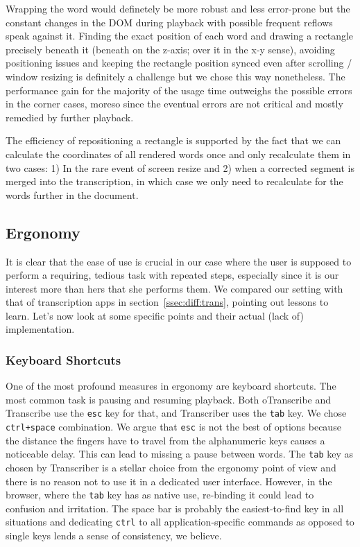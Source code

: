 \documentclass{svproc}
\begin{document}
Wrapping the word would definetely be more robust and less error-prone but the
constant changes in the DOM during playback with possible frequent reflows speak
against it. Finding the exact position of each word and drawing a rectangle
precisely beneath it (beneath on the z-axis; over it in the x-y sense), avoiding
positioning issues and keeping the rectangle position synced even after scrolling
/ window resizing is definitely a challenge but we chose this way nonetheless.
The performance gain for the majority of the usage time outweighs the possible
errors in the corner cases, moreso since the eventual errors are not critical
and mostly remedied by further playback.

The efficiency of repositioning a rectangle is supported by the fact that we can
calculate the coordinates of all rendered words once and only recalculate them
in two cases: 1) In the rare event of screen resize and 2) when a corrected
segment is merged into the transcription, in which case we only need to
recalculate for the words further in the document.

\subsection{Ergonomy}

It is clear that the ease of use is crucial in our case where the user is
supposed to perform a requiring, tedious task with repeated steps, especially
since it is our interest more than hers that she performs them. We compared our
setting with that of transcription apps in section~\ref{ssec:diff:trans},
pointing out lessons to learn. Let's now look at some specific points and their
actual (lack of) implementation.

\subsubsection{Keyboard Shortcuts}

One of the most profound measures in ergonomy are keyboard shortcuts. The most
common task is pausing and resuming playback. Both oTranscribe and Transcribe
use the \texttt{esc} key for that, and Transcriber uses the \texttt{tab} key.
We chose \texttt{ctrl+space} combination. We argue that \texttt{esc} is not the
best of options because the distance the fingers have to travel from the
alphanumeric keys causes a noticeable delay. This can lead to missing a pause
between words. The \texttt{tab} key as chosen by Transcriber is a stellar choice
from the ergonomy point of view and there is no reason not to use it in a
dedicated user interface. However, in the browser, where the \texttt{tab} key
has as native use, re-binding it could lead to confusion and irritation. The
space bar is probably the easiest-to-find key in all situations and dedicating
\texttt{ctrl} to all application-specific commands as opposed to single keys
lends a sense of consistency, we believe.
\end{document}

